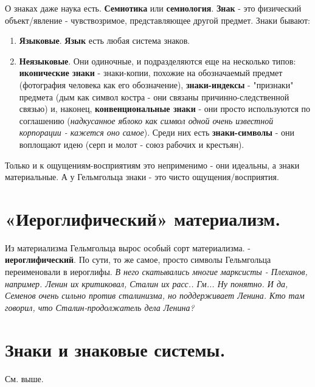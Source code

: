О знаках даже наука есть. \textbf{Семиотика} или \textbf{семиология}. \textbf{Знак} - это физический объект/явление - чувствозримое, представляющее другой предмет. Знаки бывают:
\begin{enumerate}
\item \textbf{Языковые}. \textbf{Язык} есть любая система знаков.
\item \textbf{Неязыковые}. Они одиночные, и подразделяются еще на несколько типов: \textbf{иконические знаки} - знаки-копии, похожие на обозначаемый предмет (фотография человека как его обозначение), \textbf{знаки-индексы} - "признаки" предмета (дым как символ костра - они связаны причинно-следственной связью) и, наконец, \textbf{конвенциональные знаки} - они просто используются по соглашению (\textit{надкусанное яблоко как символ одной очень известной корпорации - кажется оно самое}). Среди них есть  \textbf{знаки-символы} - они воплощают идею (серп и молот - союз рабочих и крестьян). 
\end{enumerate} 

Только и к ощущениям-восприятиям это неприменимо - они идеальны, а знаки материальные. А у Гельмгольца знаки - это чисто ощущения/восприятия.

\section{ «Иероглифический» материализм.}
Из материализма Гельмгольца вырос особый сорт материализма. - \textbf{иероглифический}. По сути, то же самое, просто символы Гельмгольца переименовали в иероглифы. \textit{В него скатывались многие марксисты - Плеханов, например. Ленин их критиковал, Сталин их расс.. Гм... Ну понятно. И да, Семенов очень сильно против сталинизма, но поддерживает Ленина. Кто там говорил, что Сталин-продолжатель дела Ленина?}

\section{ Знаки и знаковые системы.}
См. выше.

